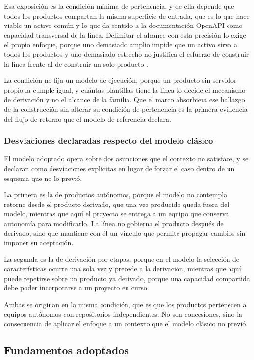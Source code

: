 Esa exposición es la condición mínima de pertenencia, y de ella depende que
todos los productos compartan la misma superficie de entrada, que es lo que
hace viable un activo común y lo que da sentido a la documentación OpenAPI
como capacidad transversal de la línea. Delimitar el alcance con esta
precisión lo exige el propio enfoque, porque uno demasiado amplio impide que
un activo sirva a todos los productos y uno demasiado estrecho no justifica el
esfuerzo de construir la línea frente al de construir un solo producto
\citep{Clements2002}.

La condición no fija un modelo de ejecución, porque un producto sin servidor
propio la cumple igual, y cuántas plantillas tiene la línea lo decide el
mecanismo de derivación y no el alcance de la familia. Que el marco absorbiera
ese hallazgo de la construcción sin alterar su condición de pertenencia es la
primera evidencia del flujo de retorno que el modelo de referencia declara.

\subsubsection*{Desviaciones declaradas respecto del modelo clásico}

El modelo adoptado opera sobre dos asunciones que el contexto no satisface, y
se declaran como desviaciones explícitas en lugar de forzar el caso dentro de
un esquema que no lo previó.

La primera es la de productos autónomos, porque el modelo no contempla retorno
desde el producto derivado, que una vez producido queda fuera del modelo,
mientras que aquí el proyecto se entrega a un equipo que conserva autonomía
para modificarlo. La línea no gobierna el producto después de derivado, sino
que mantiene con él un vínculo que permite propagar cambios sin imponer su
aceptación.

La segunda es la de derivación por etapas, porque en el modelo la selección de
características ocurre una sola vez y precede a la derivación, mientras que
aquí puede repetirse sobre un producto ya derivado, porque una capacidad
compartida debe poder incorporarse a un proyecto en curso.

Ambas se originan en la misma condición, que es que los productos pertenecen
a equipos autónomos con repositorios independientes. No son concesiones, sino
la consecuencia de aplicar el enfoque a un contexto que el modelo clásico no
previó.

\subsection{Fundamentos adoptados}
\label{sec:fundamentos-adoptados}

